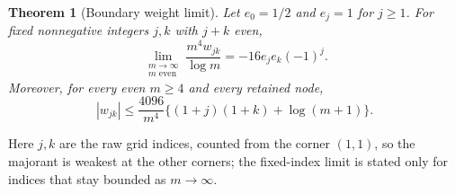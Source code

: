 \documentclass[preprint,12pt,a4paper]{elsarticle}
\newtheorem{theorem}{Theorem}[section]
\theoremstyle{remark}
\begin{document}
\begin{theorem}[Boundary weight limit]\label{thm:padua-weights}
Let $e_0=1/2$ and $e_j=1$ for $j\ge1$. For fixed nonnegative integers
$j,k$ with $j+k$ even,
\begin{equation}\label{eq:padua-weight-limit}
 \lim_{\substack{m\to\infty\\m\text{ even}}}
 \frac{m^4w_{jk}}{\log m}=-16e_je_k(-1)^j.
\end{equation}
Moreover, for every even $m\ge4$ and every retained node,
\begin{equation}\label{eq:padua-weight-majorant}
 |w_{jk}|\le\frac{4096}{m^4}
       \bigl\{(1+j)(1+k)+\log(m+1)\bigr\}.
\end{equation}
\end{theorem}
Here $j,k$ are the raw grid indices, counted from the corner $(1,1)$, so the
majorant is weakest at the other corners; the fixed-index limit is stated only
for indices that stay bounded as $m\to\infty$.
\end{document}

